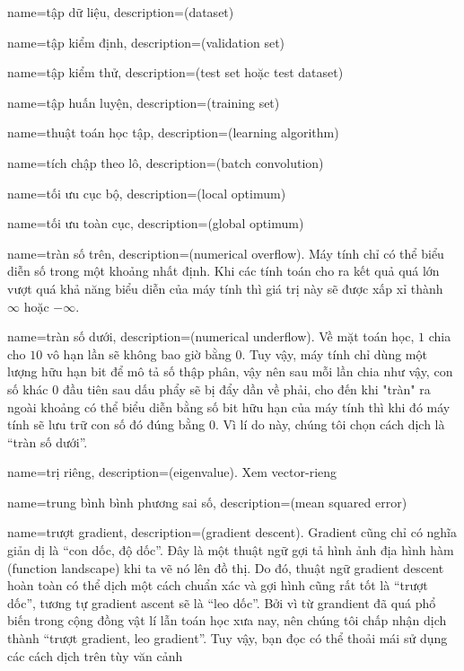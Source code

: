 {
    name={tập dữ liệu},
    description={(dataset)}
}

{
    name={tập kiểm định},
    description={(validation set)}
}

{
    name={tập kiểm thử},
    description={(test set hoặc test dataset)}
}

{
    name={tập huấn luyện},
    description={(training set)}
}

{
    name={thuật toán học tập},
    description={(learning algorithm)}
}

{
    name={tích chập theo lô},
    description={(batch convolution)}
}

{
    name={tối ưu cục bộ},
    description={(local optimum)}
}

{
    name={tối ưu toàn cục},
    description={(global optimum)}
}

{
    name={tràn số trên},
    description={(numerical overflow). Máy tính
    chỉ có thể biểu diễn số trong một khoảng nhất định.
    Khi các tính toán cho ra kết quả quá lớn vượt quá
    khả năng biểu diễn của máy tính thì giá trị này sẽ
    được xấp xỉ thành $\infty$ hoặc $-\infty$.}
}

{
    name={tràn số dưới},
    description={(numerical underflow). Về mặt toán học,
    $1$ chia cho $10$ vô hạn lần sẽ không bao giờ bằng $0$.
    Tuy vậy, máy tính chỉ dùng một lượng hữu hạn bit để mô tả
    số thập phân, vậy nên sau mỗi lần chia như vậy, con số
    khác $0$ đầu tiên sau dấu phẩy sẽ bị đẩy dần về phải,
    cho đến khi "tràn" ra ngoài khoảng có thể biểu diễn
    bằng số bit hữu hạn của máy tính thì khi đó máy tính
    sẽ lưu trữ con số đó đúng bằng $0$. Vì lí do này,
    chúng tôi chọn cách dịch là ``tràn số dưới''.}
}

{
    name={trị riêng},
    description={(eigenvalue). Xem \gls{vector-rieng}}
}

{
    name={trung bình bình phương sai số},
    description={(mean squared error)}
}


{
    name={trượt gradient},
    description={(gradient descent). Gradient cũng chỉ có
    nghĩa giản dị là ``con dốc, độ dốc''. Đây là một thuật ngữ
    gợi tả hình ảnh địa hình hàm (function landscape) khi ta
    vẽ nó lên đồ thị. Do đó, thuật ngữ gradient descent
    hoàn toàn có thể dịch một cách chuẩn xác và gợi hình
    cũng rất tốt là ``trượt dốc'', tương tự gradient ascent
    sẽ là ``leo dốc''. Bởi vì từ grandient đã quá phổ biến
    trong cộng đồng vật lí lẫn toán học xưa nay, nên chúng
    tôi chấp nhận dịch thành ``trượt gradient, leo gradient''.
    Tuy vậy, bạn đọc có thể thoải mái sử dụng các cách dịch trên
    tùy văn cảnh}
}

